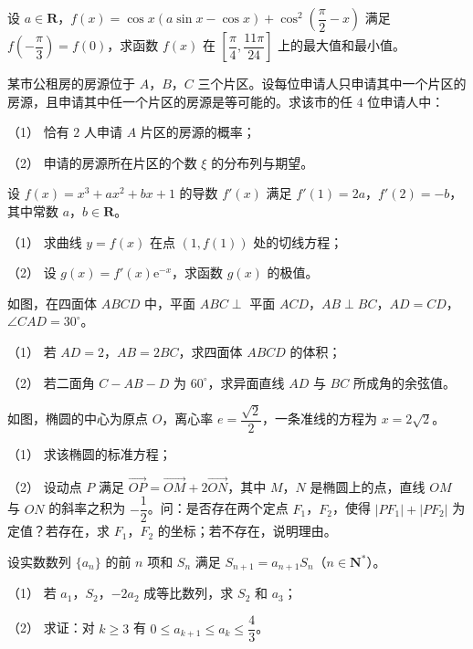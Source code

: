 \begin{question}
设 $a\in\mathbf R$，$f(x)=\cos x(a\sin x-\cos x)+\cos^2\left(\dfrac\pi2-x\right)$ 满足 $f\left(-\dfrac\pi3\right)=f(0)$，求函数 $f(x)$ 在 $\left[\dfrac\pi4,\dfrac{11\pi}{24}\right]$ 上的最大值和最小值。

\end{question}
\begin{question}
某市公租房的房源位于 $A$，$B$，$C$ 三个片区。设每位申请人只申请其中一个片区的房源，且申请其中任一个片区的房源是等可能的。求该市的任 $4$ 位申请人中：

（1） 恰有 $2$ 人申请 $A$ 片区的房源的概率；

（2） 申请的房源所在片区的个数 $\xi$ 的分布列与期望。

\end{question}
\begin{question}
设 $f(x)=x^3+ax^2+bx+1$ 的导数 $f'(x)$ 满足 $f'(1)=2a$，$f'(2)=-b$，其中常数 $a$，$b\in\mathbf R$。

（1） 求曲线 $y=f(x)$ 在点 $(1,f(1))$ 处的切线方程；

（2） 设 $g(x)=f'(x)\mathrm e^{-x}$，求函数 $g(x)$ 的极值。

\Needspace{0.4\textheight}
\end{question}
\begin{question}
如图，在四面体 $ABCD$ 中，平面 $ABC\perp$ 平面 $ACD$，$AB\perp BC$，$AD=CD$，$\angle CAD=30^\circ$。

（1） 若 $AD=2$，$AB=2BC$，求四面体 $ABCD$ 的体积；

（2） 若二面角 $C-AB-D$ 为 $60^\circ$，求异面直线 $AD$ 与 $BC$ 所成角的余弦值。
\nopagebreak[4]
\begin{center}\end{center}
\nopagebreak[4]
\Needspace{0.4\textheight}
\end{question}
\begin{question}
如图，椭圆的中心为原点 $O$，离心率 $e=\dfrac{\sqrt2}2$，一条准线的方程为 $x=2\sqrt2$。

（1） 求该椭圆的标准方程；

（2） 设动点 $P$ 满足 $\overrightarrow{OP}=\overrightarrow{OM}+2\overrightarrow{ON}$，其中 $M$，$N$ 是椭圆上的点，直线 $OM$ 与 $ON$ 的斜率之积为 $-\dfrac12$。问：是否存在两个定点 $F_1$，$F_2$，使得 $|PF_1|+|PF_2|$ 为定值？若存在，求 $F_1$，$F_2$ 的坐标；若不存在，说明理由。
\nopagebreak[4]
\begin{center}\end{center}
\nopagebreak[4]
\end{question}
\begin{question}
设实数数列 $\{a_n\}$ 的前 $n$ 项和 $S_n$ 满足 $S_{n+1}=a_{n+1}S_n$（$n\in\mathbf N^*$）。

（1） 若 $a_1$，$S_2$，$-2a_2$ 成等比数列，求 $S_2$ 和 $a_3$；

（2） 求证：对 $k\geqslant3$ 有 $0\leqslant a_{k+1}\leqslant a_k\leqslant\dfrac43$。

\end{question}